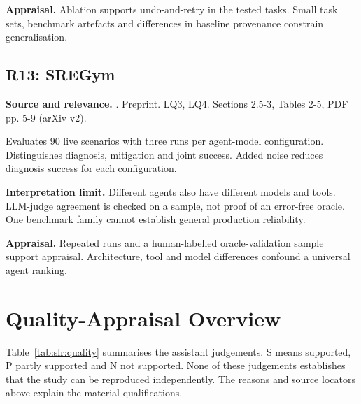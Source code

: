 \noindent\textbf{Appraisal.} Ablation supports undo-and-retry in the tested tasks. Small task sets, benchmark artefacts and differences in baseline provenance constrain generalisation.

\subsection{R13: SREGym}
\noindent\textbf{Source and relevance.} \parencite{clark2026sregym}. Preprint. LQ3, LQ4. Sections 2.5-3, Tables 2-5, PDF pp. 5-9 (arXiv v2).

Evaluates 90 live scenarios with three runs per agent-model configuration. Distinguishes diagnosis, mitigation and joint success. Added noise reduces diagnosis success for each configuration.

\noindent\textbf{Interpretation limit.} Different agents also have different models and tools. LLM-judge agreement is checked on a sample, not proof of an error-free oracle. One benchmark family cannot establish general production reliability.

\noindent\textbf{Appraisal.} Repeated runs and a human-labelled oracle-validation sample support appraisal. Architecture, tool and model differences confound a universal agent ranking.

\section{Quality-Appraisal Overview}

Table~\ref{tab:slr:quality} summarises the assistant judgements. S means
supported, P partly supported and N not supported. None of these
judgements establishes that the study can be reproduced independently.
The reasons and source locators above explain the material qualifications.

